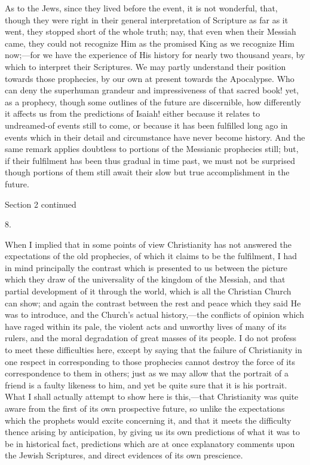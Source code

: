 As to the Jews, since they lived before the event, it is not
wonderful, that, though they were right in their general
interpretation of Scripture as far as it went, they stopped short of
the whole truth; nay, that even when their Messiah came, they could
not recognize Him as the promised King as we recognize Him now;—for
we have the experience of His history for nearly two thousand years,
by which to interpret their Scriptures. We may partly understand their
position towards those prophecies, by our own at present towards the
Apocalypse. Who can deny the superhuman grandeur and impressiveness of
that sacred book! yet, as a prophecy, though some outlines of the
future are discernible, how differently it affects us from the
predictions of Isaiah! either because it relates to undreamed-of
events still to come, or because it has been fulfilled long ago in
events which in their detail and circumstance have never become
history. And the same remark applies doubtless to portions of the
Messianic prophecies still; but, if their fulfilment has been
thus gradual in time past, we must not be surprised though portions of
them still await their slow but true accomplishment in the future.

Section 2 continued


8.

When I implied that in some points of view Christianity has not
answered the expectations of the old prophecies, of which it claims to
be the fulfilment, I had in mind principally the contrast which is
presented to us between the picture which they draw of the
universality of the kingdom of the Messiah, and that partial
development of it through the world, which is all the Christian Church
can show; and again the contrast between the rest and peace which they
said He was to introduce, and the Church's actual history,—the
conflicts of opinion which have raged within its pale, the violent
acts and unworthy lives of many of its rulers, and the moral
degradation of great masses of its people. I do not profess to meet
these difficulties here, except by saying that the failure of
Christianity in one respect in corresponding to those prophecies
cannot destroy the force of its correspondence to them in others; just
as we may allow that the portrait of a friend is a faulty likeness to
him, and yet be quite sure that it is his portrait. What I shall
actually attempt to show here is this,—that Christianity was quite
aware from the first of its own prospective future, so unlike the
expectations which the prophets would excite concerning it, and that
it meets the difficulty thence arising by anticipation, by giving us
its own predictions of what it was to be in historical fact,
predictions which are at once explanatory comments upon the Jewish
Scriptures, and direct evidences of its own prescience.

